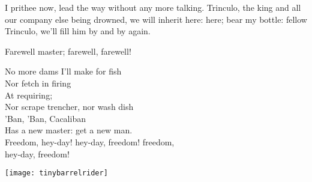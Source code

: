 \begin{prose_speech}[Stephano] 
I prithee now, lead the way without any more talking. Trinculo, the king and all our company else being drowned, we will inherit here: here; bear my bottle: fellow Trinculo, we'll fill him by and by again.
\end{prose_speech}

\begin{prose_speech}[Caliban] 
Farewell master; farewell, farewell!
\end{prose_speech}


\begin{verse_speech}[Caliban] 
No more dams I'll make for fish\\
Nor fetch in firing\\
At requiring;\\
Nor scrape trencher, nor wash dish\\
'Ban, 'Ban, Cacaliban\\
Has a new master: get a new man.\\
Freedom, hey-day! hey-day, freedom! freedom,\\
hey-day, freedom!
\end{verse_speech}


\exeunt{}

\begin{letter}
	\vfill
	\centering
	\texttt{[image: tinybarrelrider]}
\end{letter}